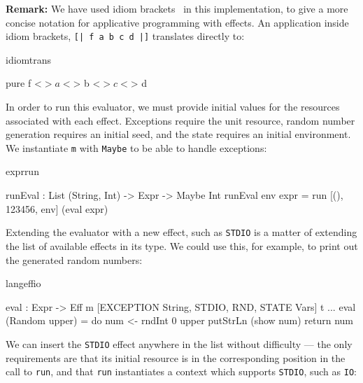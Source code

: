 
\noindent
\textbf{Remark:}
We have used idiom brackets~\cite{McBride2007} in this implementation, to
give a more concise notation for applicative programming with effects.
An application inside idiom brackets, \texttt{[| f a b c d |]} translates
directly to:

\begin{SaveVerbatim}{idiomtrans}

pure f <$> a <$> b <$> c <$> d

\end{SaveVerbatim}

\noindent
In order to run this evaluator, we must provide initial values for the resources
associated with each effect. Exceptions require the unit resource, random
number generation requires an initial seed, and the state requires an initial
environment. We instantiate \texttt{m} with \texttt{Maybe} to be able
to handle exceptions:

\begin{SaveVerbatim}{exprrun}

runEval : List (String, Int) -> Expr -> Maybe Int
runEval env expr = run [(), 123456, env] (eval expr)

\end{SaveVerbatim}

\noindent
Extending the evaluator with a new effect, such as \texttt{STDIO} is a matter
of extending the list of available effects in its type.  We could use this, for
example, to print out the generated random numbers:

\begin{SaveVerbatim}{langeffio}

eval : Expr -> 
       Eff m [EXCEPTION String, STDIO, 
              RND, STATE Vars] t
...
eval (Random upper) = do num <- rndInt 0 upper
                         putStrLn (show num)
                         return num

\end{SaveVerbatim}

\noindent
We can insert the \texttt{STDIO} effect anywhere in the list without difficulty
--- the only requirements are that its initial resource is in the corresponding
position in the call to \texttt{run}, and that \texttt{run} instantiates
a context which supports \texttt{STDIO}, such as \texttt{IO}:

